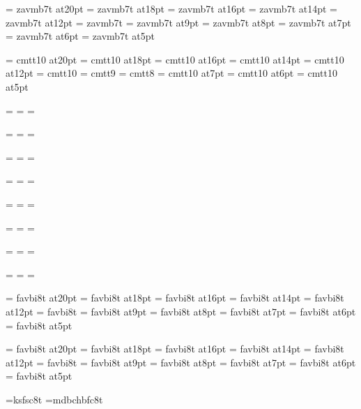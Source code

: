 \font\twentybf=     zavmb7t at20pt
\font\eighteenbf=   zavmb7t at18pt
\font\sixteenbf=    zavmb7t at16pt
\font\fourteenbf=   zavmb7t at14pt
\font\twelvebf=     zavmb7t at12pt
\font\tenbf=        zavmb7t
\font\ninebf=       zavmb7t at9pt
\font\eightbf=      zavmb7t at8pt
\font\sevenbf=      zavmb7t at7pt
\font\sixbf=        zavmb7t at6pt
\font\fivebf=       zavmb7t at5pt

\font\twentytt=     cmtt10 at20pt
\font\eighteentt=   cmtt10 at18pt
\font\sixteentt=    cmtt10 at16pt
\font\fourteentt=   cmtt10 at14pt
\font\twelvett=     cmtt10 at12pt
\font\tentt=        cmtt10
\font\ninett=       cmtt9
\font\eighttt=      cmtt8
\font\seventt=      cmtt10 at7pt
\font\sixtt=        cmtt10 at6pt
\font\fivett=       cmtt10 at5pt




=\tenrm
{}=\sevenrm
{}=\fiverm
\def\rm{\fam=0 \tenrm}

=\teni
{}=\seveni
{}=\fivei
\def\mit{\fam=1}

=\tensy
{}=\sevensy
{}=\fivesy
\def\cal{\fam=2}

=\twelveex
{}=\nineex
{}=\sevenex


\def\it{\fam=\itfam \tenit}
\textfont\itfam=\tenit
\scriptfont\itfam=\sevenit
\scriptscriptfont\itfam=\fiveit

\def\sl{\fam=\slfam \tensl}
\textfont\slfam=\tensl
\scriptfont\slfam=\sevensl
\scriptscriptfont\slfam=\fivesl

\def\bf{\fam=\bffam \tenbf}
\textfont\bffam=\tenbf
\scriptfont\bffam=\sevenbf
\scriptscriptfont\bffam=\fivebf

\def\tt{\fam=\ttfam \tentt}
\textfont\ttfam=\tentt
\scriptfont\ttfam=\seventt
\scriptscriptfont\ttfam=\fivett

\font\twentyitbf=      favbi8t at20pt
\font\eighteenitbf=    favbi8t at18pt
\font\sixteenitbf=     favbi8t at16pt
\font\fourteenitbf=    favbi8t at14pt
\font\twelveitbf=      favbi8t at12pt
\font\itbf=            favbi8t
\font\nineitbf=        favbi8t at9pt
\font\eightitbf=       favbi8t at8pt
\font\sevenitbf=       favbi8t at7pt
\font\sixitbf=         favbi8t at6pt
\font\fiveitbf=        favbi8t at5pt

\font\twentyslbf=      favbi8t at20pt
\font\eighteenslbf=    favbi8t at18pt
\font\sixteenslbf=     favbi8t at16pt
\font\fourteenslbf=    favbi8t at14pt
\font\twelveslbf=      favbi8t at12pt
\font\slbf=            favbi8t
\font\nineslbf=        favbi8t at9pt
\font\eightslbf=       favbi8t at8pt
\font\sevenslbf=       favbi8t at7pt
\font\sixslbf=         favbi8t at6pt
\font\fiveslbf=        favbi8t at5pt

\font\eightcaps=ksfsc8t
\font\capsbold=mdbchbfc8t


\rm 